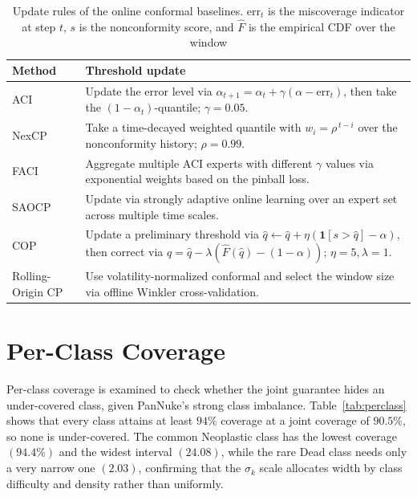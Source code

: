 \documentclass[smallextended,natbib]{svjour3}
\begin{document}
\begin{table}[htbp]
\caption{Update rules of the online conformal baselines.
\(\mathrm{err}_t\) is the miscoverage indicator at step \(t\), \(s\) is the
nonconformity score, and \(\hat{F}\) is the empirical CDF over the window}
\label{tab:baselines}
\centering
\small
\begin{tabularx}{\textwidth}{@{}lX@{}}
\toprule
Method & Threshold update \\
\midrule
ACI~\citep{gibbs2021adaptive}
& Update the error level via
\(\alpha_{t+1}=\alpha_t+\gamma(\alpha-\mathrm{err}_t)\), then take the
\((1-\alpha_t)\)-quantile; \(\gamma=0.05\). \\

NexCP~\citep{barber2023conformal}
& Take a time-decayed weighted quantile with
\(w_i=\rho^{\,t-i}\) over the nonconformity history; \(\rho=0.99\). \\

FACI~\citep{gibbs2024conformal}
& Aggregate multiple ACI experts with different \(\gamma\) values via exponential
weights based on the pinball loss. \\

SAOCP~\citep{bhatnagar2023improved}
& Update via strongly adaptive online learning over an expert set across multiple
time scales. \\

COP~\citep{hu2026conformal}
& Update a preliminary threshold via
\(\hat{q}\leftarrow \hat{q}+\eta(\mathbf{1}[s>\hat{q}]-\alpha)\), then correct via
\(q=\hat{q}-\lambda(\hat{F}(\hat{q})-(1-\alpha))\); \(\eta=5,\lambda=1\). \\

Rolling-Origin CP~\citep{halkiewicz2026rolling}
& Use volatility-normalized conformal and select the window size via offline
Winkler cross-validation. \\
\bottomrule
\end{tabularx}
\end{table}

\section{Per-Class Coverage}\label{secA:perclass}

Per-class coverage is examined to check whether the joint guarantee hides an
under-covered class, given PanNuke's strong class imbalance. Table~\ref{tab:perclass}
shows that every class attains at least \(94\%\) coverage at a joint coverage of
\(90.5\%\), so none is under-covered. The common Neoplastic class has the lowest
coverage \((94.4\%)\) and the widest interval \((24.08)\), while the rare Dead class
needs only a very narrow one \((2.03)\), confirming that the \(\sigma_k\) scale
allocates width by class difficulty and density rather than uniformly.
\end{document}
